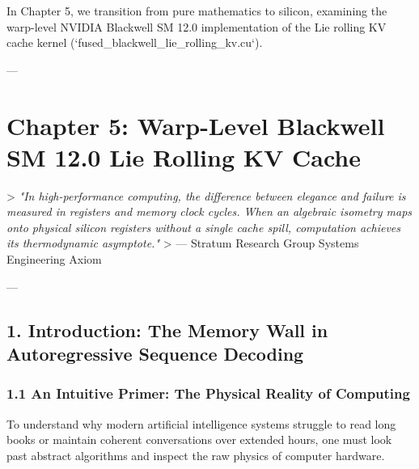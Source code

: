 \documentclass[11pt,twoside,openright]{amsbook}
\begin{document}
{{{{{{In Chapter 5, we transition from pure mathematics to silicon, examining the warp-level NVIDIA Blackwell SM 12.0 implementation of the Lie rolling KV cache kernel (`fused_blackwell_lie_rolling_kv.cu`).


---

\chapter{Chapter 5: Warp-Level Blackwell SM 12.0 Lie Rolling KV Cache}

> \textit{"In high-performance computing, the difference between elegance and failure is measured in registers and memory clock cycles. When an algebraic isometry maps onto physical silicon registers without a single cache spill, computation achieves its thermodynamic asymptote."}  
> — Stratum Research Group Systems Engineering Axiom

---

\section{1. Introduction: The Memory Wall in Autoregressive Sequence Decoding}

\subsection{1.1 An Intuitive Primer: The Physical Reality of Computing}

To understand why modern artificial intelligence systems struggle to read long books or maintain coherent conversations over extended hours, one must look past abstract algorithms and inspect the raw physics of computer hardware.

}}}}}}
\end{document}
